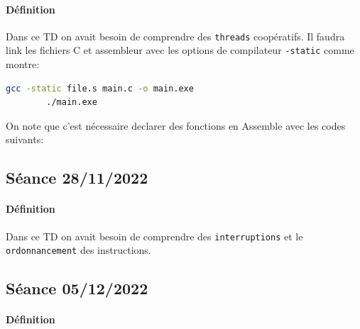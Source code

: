 \documentclass{article}
\begin{document}
\paragraph{Définition}Dans ce TD on avait besoin de comprendre des \texttt{threads} coopératifs. Il faudra link les fichiers C et assembleur avec les options de compilateur \texttt{-static} comme montre:
\begin{scriptsize}\mycode
    \begin{lstlisting}[language=Bash]
        gcc -static file.s main.c -o main.exe
        ./main.exe
    \end{lstlisting}
\end{scriptsize}
On note que c'est nécessaire declarer des fonctions en Assemble avec les codes suivants:
\begin{scriptsize}\mycode
    
\end{scriptsize}
\begin{scriptsize}\myRISCV
    
\end{scriptsize}

\newpage\subsection{Séance 28/11/2022}
\paragraph{Définition}Dans ce TD on avait besoin de comprendre des \texttt{interruptions} et le \texttt{ordonnancement} des instructions.
\begin{scriptsize}\mycode
    
\end{scriptsize}

\newpage\subsection{Séance 05/12/2022}
\paragraph{Définition}
\begin{scriptsize}\mycode
    
\end{scriptsize}
\end{document}
